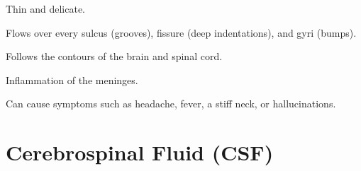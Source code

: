 \begin{coloredlist}
\begin{coloredlist}
        \item Thin and delicate.
        \item Flows over every sulcus (grooves), fissure (deep indentations), and gyri (bumps).
        \item Follows the contours of the brain and spinal cord.
    \end{coloredlist}
    \item {}
    \begin{coloredlist}
        \item Inflammation of the meninges.
        \item Can cause symptoms such as headache, fever, a stiff neck, or hallucinations.
    \end{coloredlist}
\end{coloredlist}

\section{Cerebrospinal Fluid (CSF)}

